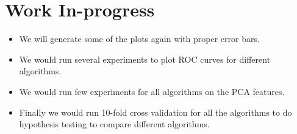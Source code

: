 \documentclass[10pt]{scrartcl}
\begin{document}
\section*{Work In-progress}
\begin{itemize}
\item We will generate some of the plots again with proper error bars. 
\item We would run several experiments to plot ROC curves for different algorithms.
\item We would run few experiments for all algorithms on the PCA features. 
\item Finally we would  run 10-fold cross validation for all the algorithms to do hypothesis testing to compare different algorithms.
\end{itemize} 
\end{document}
